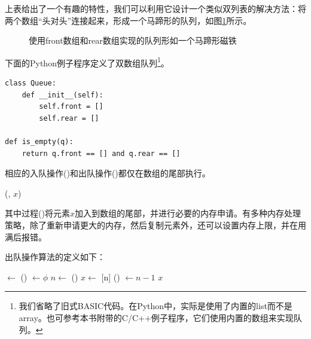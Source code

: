 \documentclass[b5paper]{ctexart}
\begin{document}
上表给出了一个有趣的特性，我们可以利用它设计一个类似双列表的解决方法：将两个数组“头对头”连接起来，形成一个马蹄形的队列，如图\ref{fig:horseshoe-array}所示。

\begin{figure}[htbp]
  \centering
  \caption{使用front数组和rear数组实现的队列形如一个马蹄形磁铁} \label{fig:horseshoe-array}
\end{figure}

下面的Python例子程序定义了双数组队列\footnote{我们省略了旧式BASIC代码。在Python中，实际是使用了内置的list而不是array。也可参考本书附带的C/C++例子程序，它们使用内置的数组来实现队列。}。

\lstset{language=Python}
\begin{lstlisting}
class Queue:
    def __init__(self):
        self.front = []
        self.rear = []

def is_empty(q):
    return q.front == [] and q.rear == []
\end{lstlisting}

相应的入队操作()和出队操作()都仅在数组的尾部执行。

\begin{algorithmic}
  \State {}(, $x$)
\EndFunction
\end{algorithmic}

其中过程()将元素$x$加入到数组的尾部，并进行必要的内存申请。有多种内存处理策略，除了重新申请更大的内存，然后复制元素外，还可以设置内存上限，并在用满后报错。

出队操作算法的定义如下：

\begin{algorithmic}
    \State {} $\gets$ ()
    \State {} $\gets \phi$
  \EndIf
  \State $n \gets$ ()
  \State $x \gets$ [n]
  \State {}() $\gets n - 1$
  \State \Return $x$
\EndFunction
\end{algorithmic}
\end{document}
